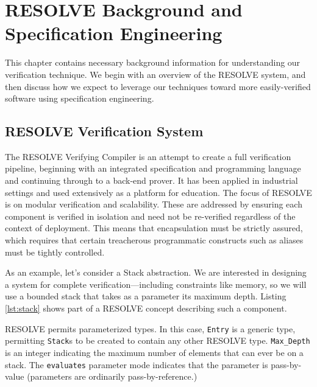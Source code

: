 \chapter{RESOLVE Background and Specification Engineering}\label{ch:resolveBackground}

This chapter contains necessary background information for understanding our verification technique.  We begin with an overview of the RESOLVE system, and then discuss how we expect to leverage our techniques toward more easily-verified software using specification engineering.


\section{RESOLVE Verification System}

The RESOLVE\cite{RESOLVE} Verifying Compiler is an attempt to create a full verification pipeline, beginning with an integrated specification and programming language and continuing through to a back-end prover.  It has been applied in industrial settings\cite{hollingsworth2000experience} and used extensively as a platform for education\cite{leonard2009injecting, sitaraman2009engaging, sitaraman2001formal}.  The focus of RESOLVE is on modular verification and scalability.  These are addressed by ensuring each component is verified in isolation and need not be re-verified regardless of the context of deployment.  This means that encapsulation must be strictly assured, which requires that certain treacherous programmatic constructs such as aliases must be tightly controlled.

As an example, let's consider a Stack abstraction.  We are interested in designing a system for complete verification---including constraints like memory, so we will use a bounded stack that takes as a parameter its maximum depth.  Listing \ref{lst:stack} shows part of a RESOLVE concept describing such a component.



RESOLVE permits parameterized types.  In this case, \texttt{Entry} is a generic type, permitting \texttt{Stack}s to be created to contain any other RESOLVE type.  \texttt{Max\_Depth} is an integer indicating the maximum number of elements that can ever be on a stack.  The \texttt{evaluates} parameter mode indicates that the parameter is pass-by-value (parameters are ordinarily pass-by-reference.)

